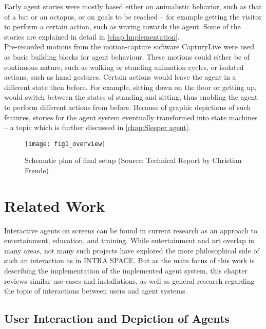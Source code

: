 \documentclass[draft,final]{vutinfth} %
\begin{document}
Early agent stories were mostly based either on animalistic behavior, such as that of a bat or an octopus, or on goals to be reached – for example getting the visitor to perform a certain action, such as waving towards the agent. 
Some of the stories are explained in detail in \autoref{chap:Implementation}. \\
Pre-recorded motions from the motion-capture software CapturyLive were used as basic building blocks for agent behaviour. 
These motions could either be of continuous nature, such as walking or standing animation cycles, or isolated actions, such as hand gestures. 
Certain actions would leave the agent in a different state then before. 
For example, sitting down on the floor or getting up, would switch between the states of standing and sitting, thus enabling the agent to perform different actions from before. 
Because of graphic depictions of such features, stories for the agent system eventually transformed into state machines – a topic which is further discussed in \autoref{chap:Sleeper agent}.

\begin{figure}[h]
	\centering
	\texttt{[image: fig1\_overview]}
	\caption{Schematic plan of final setup (Source: Technical Report by Christian Freude)}
	\label{fig:fig1_overview}
\end{figure}

\chapter{Related Work}
\label{chap:relatedwork}

Interactive agents on screens can be found in current research as an approach to entertainment, education, and training. 
While entertainment and art overlap in many areas, not many such projects have explored the more philosophical side of such an interaction as in INTRA SPACE. 
But as the main focus of this work is describing the implementation of the implemented agent system, this chapter reviews similar use-cases and installations, as well as general research regarding the topic of interactions between users and agent systems.

\section{User Interaction and Depiction of Agents}
\label{chap:userinteraction}
\end{document}
